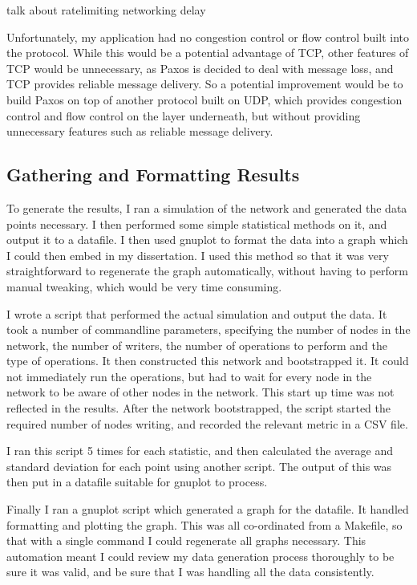 \documentclass[12pt,twoside,notitlepage]{report}
\begin{document}
talk about ratelimiting
networking delay

Unfortunately, my application had no congestion control or flow control built into the protocol.
While this would be a potential advantage of TCP, other features of TCP would be unnecessary, as
Paxos is decided to deal with message loss, and TCP provides reliable message delivery. So a
potential improvement would be to build Paxos on top of another protocol built on UDP, which
provides congestion control and flow control on the layer underneath, but without providing
unnecessary features such as reliable message delivery.


\subsection{Gathering and Formatting Results}

To generate the results, I ran a simulation of the network and generated the data points
necessary. I then performed some simple statistical methods on it, and output it to a datafile. I
then used gnuplot to format the data into a graph which I could then embed in my dissertation. I
used this method so that it was very straightforward to regenerate the graph automatically,
without having to perform manual tweaking, which would be very time consuming.

I wrote a script that performed the actual simulation and output the data. It took a number of
commandline parameters, specifying the number of nodes in the network, the number of writers, the
number of operations to perform and the type of operations. It then constructed this network and
bootstrapped it. It could not immediately run the operations, but had to wait for every node in
the network to be aware of other nodes in the network. This start up time was not reflected in the
results. After the network bootstrapped, the script started the required number of nodes writing,
and recorded the relevant metric in a CSV file.

I ran this script 5 times for each statistic, and then calculated the average and standard
deviation for each point using another script. The output of this was then put in a datafile
suitable for gnuplot to process.

Finally I ran a gnuplot script which generated a graph for the datafile. It handled formatting and
plotting the graph. This was all co-ordinated from a Makefile, so that with a single command I
could regenerate all graphs necessary. This automation meant I could review my data generation
process thoroughly to be sure it was valid, and be sure that I was handling all the data
consistently.
\end{document}
